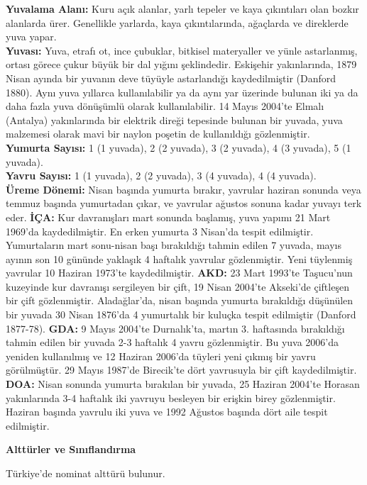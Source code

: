 \documentclass[
  letterpaper,
  DIV=11,
  numbers=noendperiod]{scrreprt}
\begin{document}
\textbf{Yuvalama Alanı:} Kuru açık alanlar, yarlı tepeler ve kaya
çıkıntıları olan bozkır alanlarda ürer. Genellikle yarlarda, kaya
çıkıntılarında, ağaçlarda ve direklerde yuva yapar.\\
\textbf{Yuvası:} Yuva, etrafı ot, ince çubuklar, bitkisel materyaller ve
yünle astarlanmış, ortası görece çukur büyük bir dal yığını şeklindedir.
Eskişehir yakınlarında, 1879 Nisan ayında bir yuvanın deve tüyüyle
astarlandığı kaydedilmiştir (Danford 1880). Aynı yuva yıllarca
kullanılabilir ya da aynı yar üzerinde bulunan iki ya da daha fazla yuva
dönüşümlü olarak kullanılabilir. 14 Mayıs 2004'te Elmalı (Antalya)
yakınlarında bir elektrik direği tepesinde bulunan bir yuvada, yuva
malzemesi olarak mavi bir naylon poşetin de kullanıldığı gözlenmiştir.\\
\textbf{Yumurta Sayısı:} 1 (1 yuvada), 2 (2 yuvada), 3 (2 yuvada), 4 (3
yuvada), 5 (1 yuvada).\\
\textbf{Yavru Sayısı:} 1 (1 yuvada), 2 (2 yuvada), 3 (4 yuvada), 4 (4
yuvada).\\
\textbf{Üreme Dönemi:} Nisan başında yumurta bırakır, yavrular haziran
sonunda veya temmuz başında yumurtadan çıkar, ve yavrular ağustos sonuna
kadar yuvayı terk eder. \textbf{İÇA:} Kur davranışları mart sonunda
başlamış, yuva yapımı 21 Mart 1969'da kaydedilmiştir. En erken yumurta 3
Nisan'da tespit edilmiştir. Yumurtaların mart sonu-nisan başı
bırakıldığı tahmin edilen 7 yuvada, mayıs ayının son 10 gününde yaklaşık
4 haftalık yavrular gözlenmiştir. Yeni tüylenmiş yavrular 10 Haziran
1973'te kaydedilmiştir. \textbf{AKD:} 23 Mart 1993'te Taşucu'nun
kuzeyinde kur davranışı sergileyen bir çift, 19 Nisan 2004'te Akseki'de
çiftleşen bir çift gözlenmiştir. Aladağlar'da, nisan başında yumurta
bırakıldığı düşünülen bir yuvada 30 Nisan 1876'da 4 yumurtalık bir
kuluçka tespit edilmiştir (Danford 1877-78). \textbf{GDA:} 9 Mayıs
2004'te Durnalık'ta, martın 3. haftasında bırakıldığı tahmin edilen bir
yuvada 2-3 haftalık 4 yavru gözlenmiştir. Bu yuva 2006'da yeniden
kullanılmış ve 12 Haziran 2006'da tüyleri yeni çıkmış bir yavru
görülmüştür. 29 Mayıs 1987'de Birecik'te dört yavrusuyla bir çift
kaydedilmiştir. \textbf{DOA:} Nisan sonunda yumurta bırakılan bir
yuvada, 25 Haziran 2004'te Horasan yakınlarında 3-4 haftalık iki yavruyu
besleyen bir erişkin birey gözlenmiştir. Haziran başında yavrulu iki
yuva ve 1992 Ağustos başında dört aile tespit edilmiştir.

\textbf{Alttürler ve Sınıflandırma}

Türkiye'de nominat alttürü bulunur.
\end{document}
